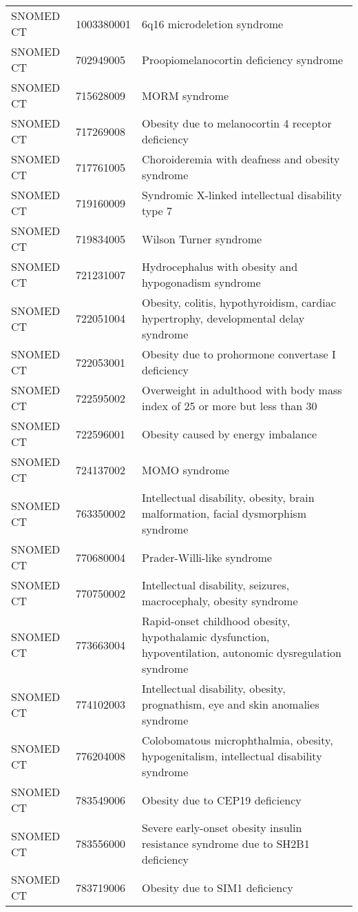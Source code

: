 \begin{longtable}{p{}p{}p{}}
  SNOMED CT & 1003380001 & 6q16 microdeletion syndrome \\ 
  SNOMED CT & 702949005 & Proopiomelanocortin deficiency syndrome \\ 
  SNOMED CT & 715628009 & MORM syndrome \\ 
  SNOMED CT & 717269008 & Obesity due to melanocortin 4 receptor deficiency \\ 
  SNOMED CT & 717761005 & Choroideremia with deafness and obesity syndrome \\ 
  SNOMED CT & 719160009 & Syndromic X-linked intellectual disability type 7 \\ 
  SNOMED CT & 719834005 & Wilson Turner syndrome \\ 
  SNOMED CT & 721231007 & Hydrocephalus with obesity and hypogonadism syndrome \\ 
  SNOMED CT & 722051004 & Obesity, colitis, hypothyroidism, cardiac hypertrophy, developmental delay syndrome \\ 
  SNOMED CT & 722053001 & Obesity due to prohormone convertase I deficiency \\ 
  SNOMED CT & 722595002 & Overweight in adulthood with body mass index of 25 or more but less than 30 \\ 
  SNOMED CT & 722596001 & Obesity caused by energy imbalance \\ 
  SNOMED CT & 724137002 & MOMO syndrome \\ 
  SNOMED CT & 763350002 & Intellectual disability, obesity, brain malformation, facial dysmorphism syndrome \\ 
  SNOMED CT & 770680004 & Prader-Willi-like syndrome \\ 
  SNOMED CT & 770750002 & Intellectual disability, seizures, macrocephaly, obesity syndrome \\ 
  SNOMED CT & 773663004 & Rapid-onset childhood obesity, hypothalamic dysfunction, hypoventilation, autonomic dysregulation syndrome \\ 
  SNOMED CT & 774102003 & Intellectual disability, obesity, prognathism, eye and skin anomalies syndrome \\ 
  SNOMED CT & 776204008 & Colobomatous microphthalmia, obesity, hypogenitalism, intellectual disability syndrome \\ 
  SNOMED CT & 783549006 & Obesity due to CEP19 deficiency \\ 
  SNOMED CT & 783556000 & Severe early-onset obesity insulin resistance syndrome due to SH2B1 deficiency \\ 
  SNOMED CT & 783719006 & Obesity due to SIM1 deficiency \\ 

\end{longtable}
